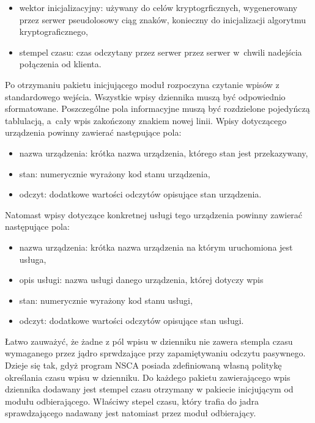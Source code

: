 \begin{itemize}
\item wektor inicjalizacyjny: używany do celów kryptogrficznych,
  wygenerowany przez serwer pseudolosowy ciąg znaków, konieczny do
  inicjalizacji algorytmu kryptograficznego,
\item stempel czasu: czas odczytany przez serwer przez serwer w~chwili
  nadejścia połączenia od klienta.
\end{itemize} 

Po otrzymaniu pakietu inicjującego moduł rozpoczyna czytanie wpisów z
standardowego wejścia. Wszystkie wpisy dziennika muszą być odpowiednio
sformatowane. Poszczególne pola informacyjne muszą być rozdzielone
pojedyńczą tablulacją, a~cały wpis zakończony znakiem nowej
linii. Wpisy dotyczącego urządzenia powinny zawierać następujące pola:

\begin{itemize}
\item nazwa urządzenia: krótka nazwa urządzenia, którego stan jest
  przekazywany,
\item stan: numerycznie wyrażony kod stanu urządzenia,
\item odczyt: dodatkowe wartości odczytów opisujące stan urządzenia.
\end{itemize}

Natomast wpisy dotyczące konkretnej usługi tego urządzenia powinny
zawierać następujące pola:

\begin{itemize}
\item nazwa urządzenia: krótka nazwa urządzenia na którym uruchomiona
  jest usługa,
\item opis usługi: nazwa usługi danego urządzenia, której dotyczy wpis
\item stan: numerycznie wyrażony kod stanu usługi,
\item odczyt: dodatkowe wartości odczytów opisujące stan usługi.
\end{itemize}

Łatwo zauważyć, że żadne z pól wpisu w dzienniku nie zawera stempla
czasu wymaganego przez jądro sprwdzające przy zapamiętywaniu odczytu
pasywnego. Dzieje się tak, gdyż program NSCA posiada zdefiniowaną
własną politykę określania czasu wpisu w dzienniku. Do każdego pakietu
zawierającego wpis dziennika dodawany jest stempel czasu otrzymany w
pakiecie inicjującym od modułu odbierającego. Właściwy stepel czasu,
który trafia do jadra sprawdzającego nadawany jest natomiast przez
moduł odbierający.

